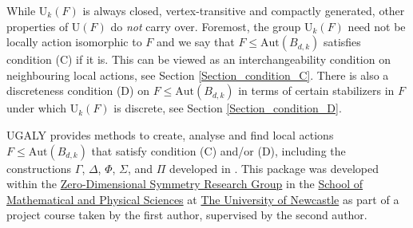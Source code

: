 \documentclass[a4paper,11pt]{report}
\begin{document}
{ While $\mathrm{U}_{k}(F)$ is always closed, vertex-transitive and compactly generated, other properties
of $\mathrm{U}(F)$ do \emph{not} carry over. Foremost, the group $\mathrm{U}_{k}(F)$ need not be locally action isomorphic to $F$ and we say that $F\le\mathrm{Aut}(B_{d,k})$ satisfies condition (C) if it is. This can be viewed as an interchangeability
condition on neighbouring local actions, see Section \ref{Section_condition_C}. There is also a discreteness condition (D) on $F\le\mathrm{Aut}(B_{d,k})$ in terms of certain stabilizers in $F$ under which $\mathrm{U}_{k}(F)$ is discrete, see Section \ref{Section_condition_D}. 

 \textsf{UGALY} provides methods to create, analyse and find local actions $F\le\mathrm{Aut}(B_{d,k})$ that satisfy condition (C) and/or (D), including the constructions $\Gamma$, $\Delta$, $\Phi$, $\Sigma$, and $\Pi$ developed in \cite{Tor20}. This package was developed within the \href{ https://zerodimensional.group/"} {Zero-Dimensional Symmetry Research Group} in the \href{ https://www.newcastle.edu.au/school/mathematical-and-physical-sciences} {School of Mathematical and Physical Sciences} at \href{ https://www.newcastle.edu.au/} {The University of Newcastle} as part of a project course taken by the first author, supervised by the
second author. }

   
\end{document}
